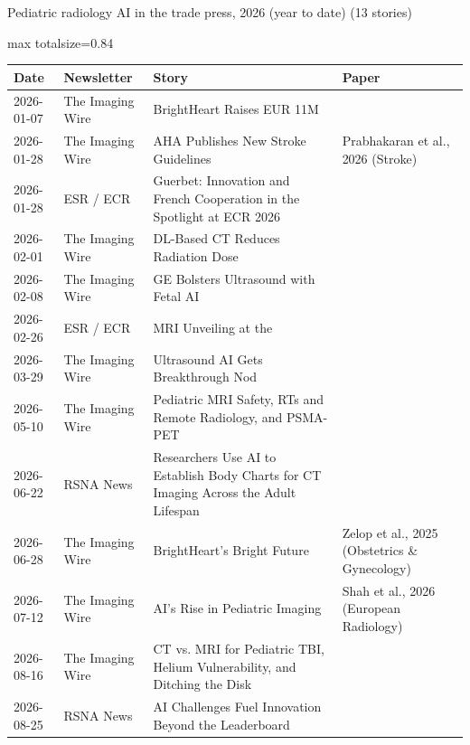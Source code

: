 \documentclass[aspectratio=169]{beamer}
\renewcommand{\arraystretch}{1.08}
\begin{document}
\begin{frame}[category=Newsletters]{Pediatric radiology AI in the trade press, 2026 (year to date) (13 stories)}
\scriptsize
\begin{adjustbox}{max totalsize={\textwidth}{0.84\textheight}}
\renewcommand{\arraystretch}{1.2}
\begin{tabular}{|l|l|>{\raggedright\arraybackslash}p{}|>{\raggedright\arraybackslash}p{}|}
\hline \textbf{Date} & \textbf{Newsletter} & \textbf{Story} & \textbf{Paper} \\ \hline
2026-01-07 & The Imaging Wire & BrightHeart Raises EUR 11M &  \\ \hline
2026-01-28 & The Imaging Wire & AHA Publishes New Stroke Guidelines & Prabhakaran et al., 2026 (Stroke) \\ \hline
2026-01-28 & ESR / ECR & Guerbet: Innovation and French Cooperation in the Spotlight at ECR 2026 &  \\ \hline
2026-02-01 & The Imaging Wire & DL-Based CT Reduces Radiation Dose &  \\ \hline
2026-02-08 & The Imaging Wire & GE Bolsters Ultrasound with Fetal AI &  \\ \hline
2026-02-26 & ESR / ECR & MRI Unveiling at the &  \\ \hline
2026-03-29 & The Imaging Wire & Ultrasound AI Gets Breakthrough Nod &  \\ \hline
2026-05-10 & The Imaging Wire & Pediatric MRI Safety, RTs and Remote Radiology, and PSMA-PET &  \\ \hline
2026-06-22 & RSNA News & Researchers Use AI to Establish Body Charts for CT Imaging Across the Adult Lifespan &  \\ \hline
2026-06-28 & The Imaging Wire & BrightHeart's Bright Future & Zelop et al., 2025 (Obstetrics \& Gynecology) \\ \hline
2026-07-12 & The Imaging Wire & AI's Rise in Pediatric Imaging & Shah et al., 2026 (European Radiology) \\ \hline
2026-08-16 & The Imaging Wire & CT vs. MRI for Pediatric TBI, Helium Vulnerability, and Ditching the Disk &  \\ \hline
2026-08-25 & RSNA News & AI Challenges Fuel Innovation Beyond the Leaderboard &  \\ \hline
\end{tabular}
\end{adjustbox}
\end{frame}
\end{document}

